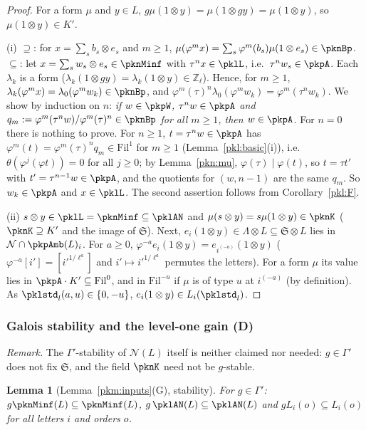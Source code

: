 \documentclass[10pt]{amsart}
\newtheorem{lemma}[theorem]{Lemma}
\theoremstyle{definition}
\theoremstyle{remark}
\newcommand{\Z}{\mathbb Z}
\begin{document}
\begin{proof}
For a form $\mu$ and $y\in L$, $g\mu(1\otimes y)=\mu(1\otimes gy)=\mu(1\otimes y)$, so $\mu(1\otimes y)\in K'$.

(i) $\supseteq$: for $x=\sum_sb_s\otimes e_s$ and $m\ge1$, $\mu(\varphi^mx)=\sum_s\varphi^m(b_s)\mu(1\otimes e_s)\in
\pknBp$. $\subseteq$: let $x=\sum_sw_s\otimes e_s\in\pknMinf$ with $\tau^nx\in\pklL$, i.e.\ $\tau^nw_s\in\pkpA$. Each
$\lambda_k$ is a form ($\lambda_k(1\otimes gy)=\lambda_k(1\otimes y)\in\Z_\ell$). Hence, for $m\ge1$,
$\lambda_k(\varphi^mx)=\lambda_0(\varphi^mw_k)\in\pknBp$, and $\varphi^m(\tau)^n\lambda_0(\varphi^mw_k)=
\varphi^m(\tau^nw_k)$. We show by induction on $n$: \emph{if $w\in\pkpW$, $\tau^nw\in\pkpA$ and $q_m:=
\varphi^m(\tau^nw)/\varphi^m(\tau)^n\in\pknBp$ for all $m\ge1$, then $w\in\pkpA$.} For $n=0$ there is nothing
to prove. For $n\ge1$, $t=\tau^nw\in\pkpA$ has $\varphi^m(t)=\varphi^m(\tau)^nq_m\in\mathrm{Fil}^1$ for $m\ge1$
(Lemma~\ref{pkl:basic}(i)), i.e.\ $\theta(\varphi^j(\varphi t))=0$ for all $j\ge0$; by Lemma~\ref{pkn:mu},
$\varphi(\tau)\mid\varphi(t)$, so $t=\tau t'$ with $t'=\tau^{n-1}w\in\pkpA$, and the quotients for $(w,n-1)$ are the
same $q_m$. So $w_k\in\pkpA$ and $x\in\pklL$. The second assertion follows from Corollary~\ref{pkl:F}.

(ii) $s\otimes y\in\pklL=\pknMinf\subseteq\pklAN$ and $\mu(s\otimes y)=s\mu(1\otimes y)\in\pknK$ ($\pknK\supseteq
K'$ and the image of $\mathfrak S$). Next, $e_i(1\otimes y)\in\Lambda\otimes L\subseteq\mathfrak S\otimes L$ lies in
$\mathcal N\cap\pkpAmb(L)_i$. For $a\ge0$, $\varphi^{-a}e_i(1\otimes y)=e_{i^{(-a)}}(1\otimes y)$ ($\varphi^{-a}[i']=
[i'^{1/\ell^a}]$ and $i'\mapsto i'^{1/\ell^a}$ permutes the letters). For a form $\mu$ its value lies in
$\pkpA\cdot K'\subseteq\mathrm{Fil}^0$, and in $\mathrm{Fil}^{-u}$ if $\mu$ is of type $u$ at $i^{(-a)}$ (by
definition). As $\pklstd_l(a,u)\in\{0,-u\}$, $e_i(1\otimes y)\in L_i(\pklstd_l)$.
\end{proof}

\subsubsection{Galois stability and the level-one gain (D)}\label{pkl:ss-D}

\emph{Remark.} The $\Gamma'$-stability of $\mathcal N(L)$ itself is neither claimed nor needed: $g\in\Gamma'$ does
not fix $\mathfrak S$, and the field $\pknK$ need not be $g$-stable.

\begin{lemma}[Lemma~\ref{pkm:inputs}(G), stability]\label{pkl:G1}
For $g\in\Gamma'$: $g\pknMinf(L)\subseteq\pknMinf(L)$, $g\,\pklAN(L)\subseteq\pklAN(L)$ and $gL_i(o)\subseteq L_i(o)$
for all letters $i$ and orders $o$.
\end{lemma}
\end{document}
